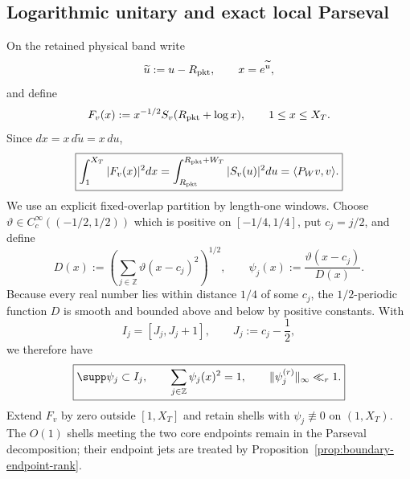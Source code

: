 \subsection{Logarithmic unitary and exact local Parseval}
On the retained physical band write
\[
\widetilde u:=u-R_{\rm pkt},
\qquad x=e^{\widetilde u},
\]
and define
\begin{equation}
F_v(x):=x^{-1/2}S_v(R_{\rm pkt}+\log x),
\qquad 1\le x\le X_T.
\label{eq:log-unitary}
\end{equation}
Since $dx=x\,d\widetilde u=x\,du$,
\begin{equation}
\boxed{
\int_1^{X_T}|F_v(x)|^2dx
=\int_{R_{\rm pkt}}^{R_{\rm pkt}+W_T}|S_v(u)|^2du
=\langle P_Wv,v\rangle.
}
\label{eq:log-unitary-norm}
\end{equation}
We use an explicit fixed-overlap partition by length-one windows. Choose
$\vartheta\in C_c^\infty((-1/2,1/2))$ which is positive on
$[-1/4,1/4]$, put $c_j=j/2$, and define
\[
D(x):=\left(\sum_{j\in\mathbb Z}\vartheta(x-c_j)^2\right)^{1/2},
\qquad
\psi_j(x):=\frac{\vartheta(x-c_j)}{D(x)}.
\]
Because every real number lies within distance $1/4$ of some $c_j$, the
$1/2$-periodic function $D$ is smooth and bounded above and below by positive
constants. With
\[
I_j=[J_j,J_j+1],
\qquad J_j:=c_j-\frac12,
\]
we therefore have
\begin{equation}
\boxed{
\supp\psi_j\subset I_j,
\qquad
\sum_{j\in\mathbb Z}\psi_j(x)^2=1,
\qquad
\|\psi_j^{(r)}\|_\infty\ll_r1.
}
\label{eq:smooth-shell-partition}
\end{equation}
Extend $F_v$ by zero outside $[1,X_T]$ and retain shells with
$\psi_j\not\equiv0$ on $(1,X_T)$. The $O(1)$ shells meeting the two core
endpoints remain in the Parseval decomposition; their endpoint jets are treated
by Proposition~\ref{prop:boundary-endpoint-rank}.

